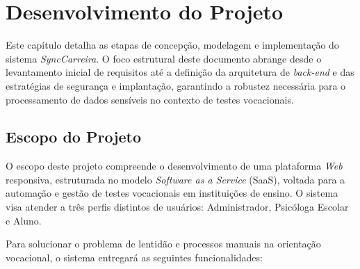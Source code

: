 \chapter{Desenvolvimento do Projeto}
\label{cha:desenvolvimento}

Este capítulo detalha as etapas de concepção, modelagem e implementação do sistema \textit{SyncCarreira}. O foco estrutural deste documento abrange desde o levantamento inicial de requisitos até a definição da arquitetura de \textit{back-end} e das estratégias de segurança e implantação, garantindo a robustez necessária para o processamento de dados sensíveis no contexto de testes vocacionais.

\section{Escopo do Projeto}

O escopo deste projeto compreende o desenvolvimento de uma plataforma \textit{Web} responsiva, estruturada no modelo \textit{Software as a Service} (SaaS), voltada para a automação e gestão de testes vocacionais em instituições de ensino. O sistema visa atender a três perfis distintos de usuários: Administrador, Psicóloga Escolar e Aluno.

Para solucionar o problema de lentidão e processos manuais na orientação vocacional, o sistema entregará as seguintes funcionalidades:

